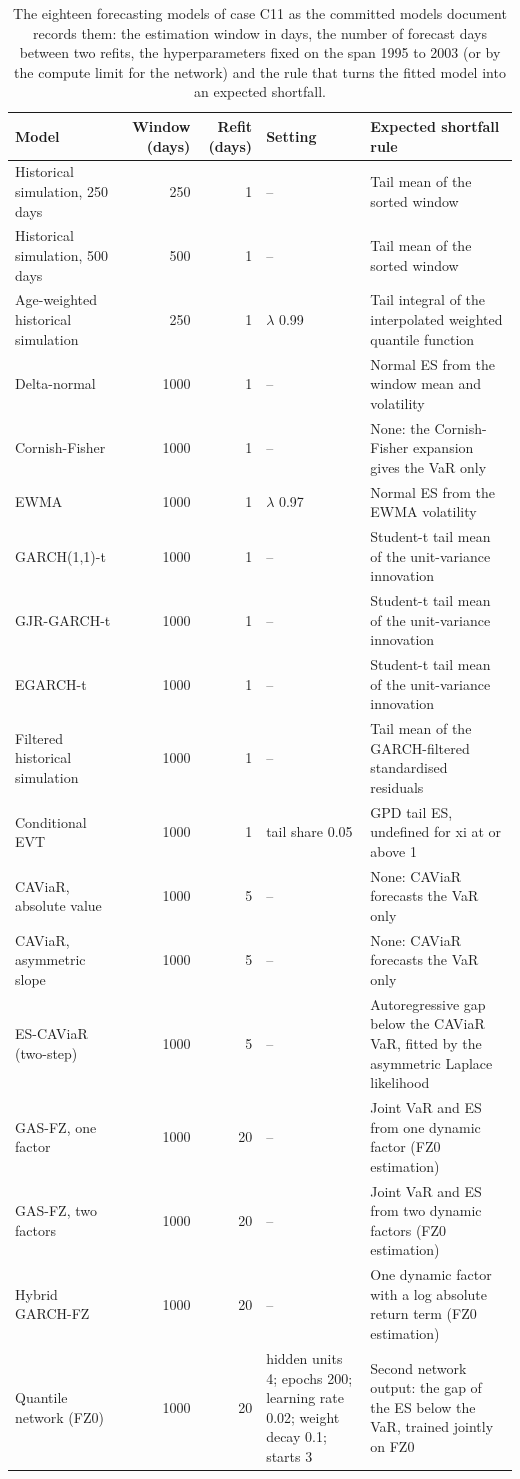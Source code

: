 \begin{table}[htbp]
\centering
\scriptsize
\setlength{\tabcolsep}{2.5pt}
\caption{The eighteen forecasting models of case C11 as the committed models document records them: the estimation window in days, the number of forecast days between two refits, the hyperparameters fixed on the span 1995 to 2003 (or by the compute limit for the network) and the rule that turns the fitted model into an expected shortfall.}
\label{tab:market-ladder}
\begin{tabular}{p{3.6cm}rrp{2.6cm}p{5.4cm}}
\toprule
Model & Window (days) & Refit (days) & Setting & Expected shortfall rule \\
\midrule
Historical simulation, 250 days & 250 & 1 & -- & Tail mean of the sorted window \\
Historical simulation, 500 days & 500 & 1 & -- & Tail mean of the sorted window \\
Age-weighted historical simulation & 250 & 1 & $\lambda$ 0.99 & Tail integral of the interpolated weighted quantile function \\
Delta-normal & 1000 & 1 & -- & Normal ES from the window mean and volatility \\
Cornish-Fisher & 1000 & 1 & -- & None: the Cornish-Fisher expansion gives the VaR only \\
EWMA & 1000 & 1 & $\lambda$ 0.97 & Normal ES from the EWMA volatility \\
GARCH(1,1)-t & 1000 & 1 & -- & Student-t tail mean of the unit-variance innovation \\
GJR-GARCH-t & 1000 & 1 & -- & Student-t tail mean of the unit-variance innovation \\
EGARCH-t & 1000 & 1 & -- & Student-t tail mean of the unit-variance innovation \\
Filtered historical simulation & 1000 & 1 & -- & Tail mean of the GARCH-filtered standardised residuals \\
Conditional EVT & 1000 & 1 & tail share 0.05 & GPD tail ES, undefined for xi at or above 1 \\
CAViaR, absolute value & 1000 & 5 & -- & None: CAViaR forecasts the VaR only \\
CAViaR, asymmetric slope & 1000 & 5 & -- & None: CAViaR forecasts the VaR only \\
ES-CAViaR (two-step) & 1000 & 5 & -- & Autoregressive gap below the CAViaR VaR, fitted by the asymmetric Laplace likelihood \\
GAS-FZ, one factor & 1000 & 20 & -- & Joint VaR and ES from one dynamic factor (FZ0 estimation) \\
GAS-FZ, two factors & 1000 & 20 & -- & Joint VaR and ES from two dynamic factors (FZ0 estimation) \\
Hybrid GARCH-FZ & 1000 & 20 & -- & One dynamic factor with a log absolute return term (FZ0 estimation) \\
Quantile network (FZ0) & 1000 & 20 & hidden units 4; epochs 200; learning rate 0.02; weight decay 0.1; starts 3 & Second network output: the gap of the ES below the VaR, trained jointly on FZ0 \\
\bottomrule
\end{tabular}
\end{table}
